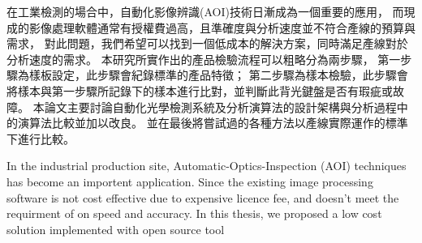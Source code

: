 \begin{abstractzh}
在工業檢測的場合中，自動化影像辨識(AOI)技術日漸成為一個重要的應用，
而現成的影像處理軟體通常有授權費過高，且準確度與分析速度並不符合產線的預算與需求，
對此問題，我們希望可以找到一個低成本的解決方案，同時滿足產線對於分析速度的需求。
本研究所實作出的產品檢驗流程可以粗略分為兩步驟，
第一步驟為樣板設定，此步驟會紀錄標準的產品特徵；
第二步驟為樣本檢驗，此步驟會將樣本與第一步驟所記錄下的樣本進行比對，並判斷此背光鍵盤是否有瑕疵或故障。
本論文主要討論自動化光學檢測系統及分析演算法的設計架構與分析過程中的演算法比較並加以改良。
並在最後將嘗試過的各種方法以產線實際運作的標準下進行比較。

\end{abstractzh}

\begin{abstracten}
In the industrial production site, Automatic-Optics-Inspection (AOI) techniques has become an importent application.
Since the existing image processing software is not cost effective due to expensive licence fee, 
and doesn't meet the requirment of on speed and accuracy. 
In this thesis, we proposed a low cost solution implemented with open source tool

\end{abstracten}